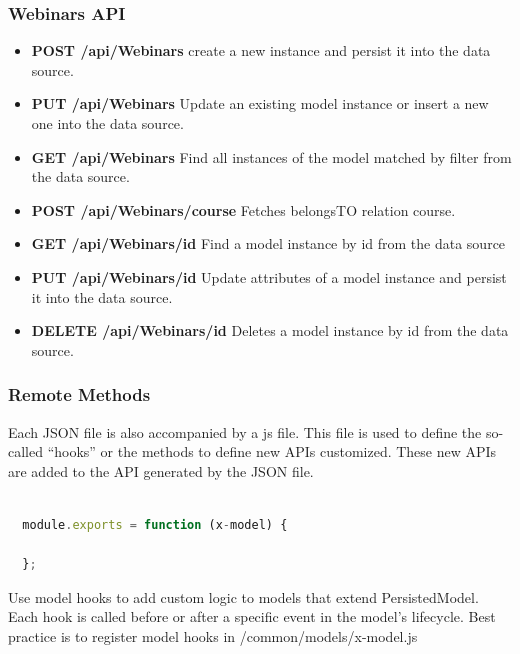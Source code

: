 \subsubsection{Webinars API}
\begin{itemize}
\item \textbf{POST /api/Webinars} create a new instance and persist it into the data source.
\item \textbf{PUT /api/Webinars} Update an existing model instance or insert a new one into the data source.
\item \textbf{GET /api/Webinars} Find all instances of the model matched by filter from the  data source.
\item \textbf{POST /api/Webinars/course} Fetches belongsTO relation course.
\item \textbf{GET /api/Webinars/id} Find a model instance by id from the data source
\item \textbf{PUT /api/Webinars/id} Update attributes of a model instance and persist it into the data source.
\item \textbf{DELETE /api/Webinars/id} Deletes a model instance by id from the data 
source.
\end{itemize}

 \subsubsection{ Remote Methods }

Each JSON file is also accompanied by a js file. This file is used to define the so-called “hooks” or the methods to define new APIs customized. These new APIs are added to the API generated by the JSON file.
  

\begin{lstlisting}[language=javascript]

  module.exports = function (x-model) {
  
  };
\end{lstlisting}


Use model hooks to add custom logic to models that extend PersistedModel. Each hook is called before or after a specific event in the model's lifecycle.
Best practice is to register model hooks in /common/models/x-model.js

